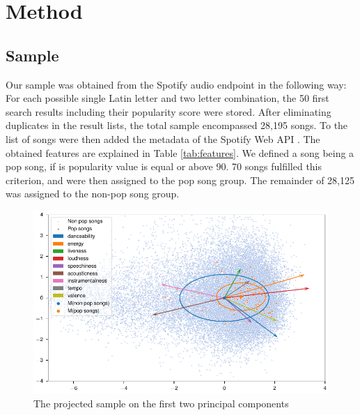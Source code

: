 \documentclass{article}
\begin{document}
\section{Method}

\subsection{Sample}
Our sample was obtained from the Spotify audio endpoint in the following way: For each possible single Latin letter and two letter combination, the 50 first search results including their popularity score were stored. After eliminating duplicates in the result lists, the total sample encompassed 28,195 songs. To the list of songs were then added the metadata of the Spotify Web API \citep{spotifyDocu}.
The obtained features are explained in Table \ref{tab:features}. We defined a song being a pop song, if is popularity value is equal or above 90. 70 songs fulfilled this criterion, and were then assigned to the pop song group. The remainder of 28,125 was assigned to the non-pop song group. 

\begin{figure}[!b]
  \centering
  \includegraphics[]{../fig/001_pca.pdf}
  \vspace*{-8mm}  
  \caption{The projected sample on the first two principal components}
  \label{fig:pca}
\end{figure}
\end{document}
